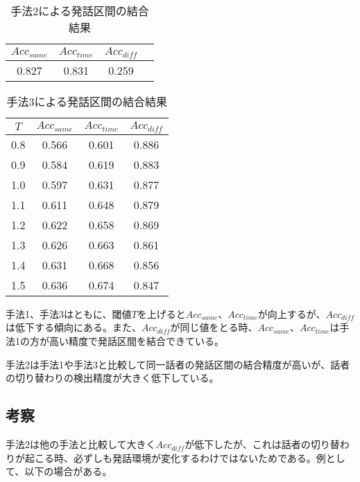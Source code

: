 \begin{table}[H]
\begin{center}
\caption{手法2による発話区間の結合結果 \label{table:result_prob2}}
\begin{tabular}{|c|c|c|c|}
\hline
$Acc_{same}$ & $Acc_{time}$ & $Acc_{diff}$ \\ \hline
0.827 & 0.831    & 0.259    \\ \hline
\end{tabular}
\end{center}
\end{table}

\begin{table}[H]
\begin{center}
\caption{手法3による発話区間の結合結果 \label{table:result_prob3}}
\begin{tabular}{|c|c|c|c|}
\hline
$T$   & $Acc_{same}$ & $Acc_{time}$ & $Acc_{diff}$ \\ \hline
0.8 & 0.566    & 0.601    & 0.886    \\ \hline
0.9 & 0.584    & 0.619    & 0.883    \\ \hline
1.0 & 0.597    & 0.631    & 0.877    \\ \hline
1.1 & 0.611    & 0.648    & 0.879    \\ \hline
1.2 & 0.622    & 0.658    & 0.869    \\ \hline
1.3 & 0.626    & 0.663    & 0.861    \\ \hline
1.4 & 0.631    & 0.668    & 0.856    \\ \hline
1.5 & 0.636    & 0.674    & 0.847    \\ \hline
\end{tabular}
\end{center}
\end{table}

手法1、手法3はともに、閾値$T$を上げると$Acc_{same}$、$Acc_{time}$が向上するが、$Acc_{diff}$は低下する傾向にある。また、$Acc_{diff}$が同じ値をとる時、$Acc_{same}$、$Acc_{time}$は手法1の方が高い精度で発話区間を結合できている。\par
手法2は手法1や手法3と比較して同一話者の発話区間の結合精度が高いが、話者の切り替わりの検出精度が大きく低下している。

\subsection{考察}
手法2は他の手法と比較して大きく$Acc_{diff}$が低下したが、これは話者の切り替わりが起こる時、必ずしも発話環境が変化するわけではないためである。例として、以下の場合がある。

